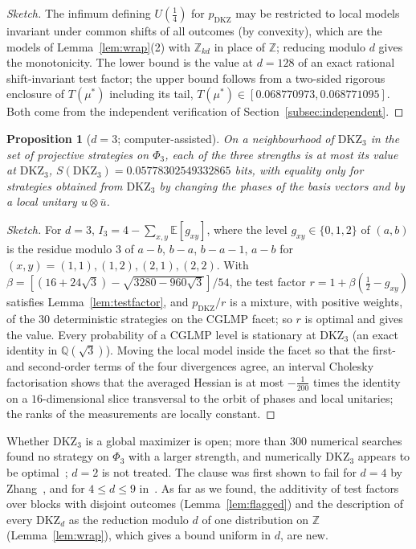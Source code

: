 \documentclass[11pt]{article}
\newtheorem{proposition}[lemma]{Proposition}
\theoremstyle{remark}
\numberwithin{equation}{section}
\newcommand{\Z}{\mathbb{Z}}
\newcommand{\E}{\mathbb{E}}
\newcommand{\DKZ}{\mathrm{DKZ}}
\begin{document}
\begin{proof}[Sketch]
The infimum defining $U(\frac14)$ for $p_{\DKZ}$ may be restricted to local models invariant under common shifts of all
outcomes (by convexity), which are the models of Lemma~\ref{lem:wrap}(2) with $\Z_{kd}$ in place of $\Z$; reducing modulo
$d$ gives the monotonicity. The lower bound is the value at $d=128$ of an exact rational shift-invariant test factor; the
upper bound follows from a two-sided rigorous enclosure of $T(\mu^*)$ including its tail,
$T(\mu^*)\in[0.068770973,0.068771095]$. Both come from the independent verification of Section~\ref{subsec:independent}.
\end{proof}

\begin{proposition}[$d=3$; computer-assisted]\label{prop:kl3}
On a neighbourhood of $\DKZ_3$ in the set of projective strategies on $\Phi_3$, each of the three strengths is at most its
value at $\DKZ_3$, $S(\DKZ_3)=0.05778302549332865$ bits, with equality only for strategies obtained from $\DKZ_3$ by
changing the phases of the basis vectors and by a local unitary $u\otimes\bar u$.
\end{proposition}

\begin{proof}[Sketch]
For $d=3$, $I_3=4-\sum_{x,y}\E[g_{xy}]$, where the level $g_{xy}\in\{0,1,2\}$ of $(a,b)$ is the residue modulo $3$ of
$a-b$, $b-a$, $b-a-1$, $a-b$ for $(x,y)=(1,1),(1,2),(2,1),(2,2)$. With
$\beta=[(16+24\sqrt3)-\sqrt{3280-960\sqrt3}]/54$, the test factor $r=1+\beta(\frac12-g_{xy})$ satisfies
Lemma~\ref{lem:testfactor}, and $p_{\DKZ}/r$ is a mixture, with positive weights, of the $30$ deterministic strategies on
the CGLMP facet; so $r$ is optimal and gives the value. Every probability of a CGLMP level is stationary at $\DKZ_3$ (an
exact identity in $\mathbb Q(\sqrt3)$). Moving the local model inside the facet so that the first- and second-order terms
of the four divergences agree, an interval Cholesky factorisation shows that the averaged Hessian is at most
$-\frac1{200}$ times the identity on a $16$-dimensional slice transversal to the orbit of phases and local unitaries; the
ranks of the measurements are locally constant.
\end{proof}

Whether $\DKZ_3$ is a global maximizer is open; more than $300$ numerical searches found no strategy on $\Phi_3$ with a
larger strength, and numerically $\DKZ_3$ appears to be optimal~\cite{vDGG,AGG}; $d=2$ is not treated. The clause was
first shown to fail for $d=4$ by Zhang~\cite{Zhang}, and for $4\le d\le9$ in~\cite{repoCGLMP}. As far as we found, the
additivity of test factors over blocks with disjoint outcomes
(Lemma~\ref{lem:flagged}) and the description of every $\DKZ_d$ as the reduction modulo $d$ of one distribution on $\Z$
(Lemma~\ref{lem:wrap}), which gives a bound uniform in $d$, are new.
\end{document}
